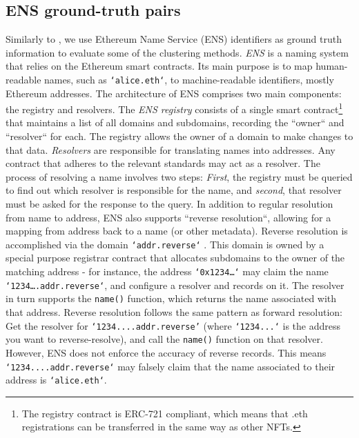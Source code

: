 \documentclass[12pt,a4paper,titlepage,oneside,english]{article}
\begin{document}
\subsection{ENS ground-truth pairs}
\label{sec:ens}
Similarly to \cite{Beres2020}, we use Ethereum Name Service (ENS) identifiers as ground truth information to evaluate some of the clustering methods.\newline
\textit{ENS} is a naming system that relies on the Ethereum smart contracts. Its main purpose is to map human-readable names, such as \texttt{`alice.eth`}, to machine-readable identifiers, mostly Ethereum addresses. The architecture of ENS comprises two main components: the registry and resolvers. \newline
The \textit{ENS registry} consists of a single smart contract\footnote{The registry contract is ERC-721 compliant, which means that .eth registrations can be transferred in the same way as other NFTs.} that maintains a list of all domains and subdomains, recording the ``owner`` and ``resolver`` for each. The registry allows the owner of a domain to make changes to that data. \citep{ENSdocs} %
\newline
\textit{Resolvers} are responsible for %
 translating names into addresses. Any contract that adheres to the relevant standards may act as a resolver. The process of resolving a name involves two steps: \textit{First}, the registry must be queried to find out which resolver is responsible for the name, and \textit{second}, that resolver must be asked for the response to the query. \newline
In addition to regular resolution from name to address, ENS also supports ``reverse resolution``, allowing for a mapping from address back to a name (or other metadata). Reverse resolution is accomplished via the %
 domain \texttt{`addr.reverse`}%
. This domain is owned by a special purpose registrar contract that allocates subdomains to the owner of the matching address - for instance, the address \texttt{`0x1234\dots`} may claim the name \texttt{`1234\dots.addr.reverse`}, and configure a resolver and records on it. The resolver in turn supports the \texttt{name()} function, which returns the name associated with that address.\newline
 Reverse resolution %
 follows the same pattern as forward resolution: Get the resolver for \texttt{`1234....addr.reverse'} (where \texttt{`1234...`} is the address you want to reverse-resolve), and call the \texttt{name()} function on that resolver. However, ENS does not enforce the accuracy of reverse records. This means \texttt{`1234....addr.reverse`} may falsely claim that the name associated to their address is \texttt{`alice.eth`}. 
 
\end{document}
